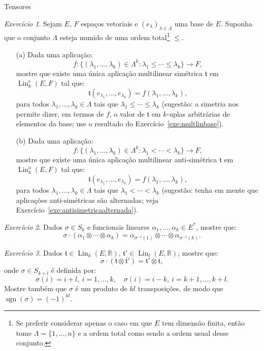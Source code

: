 \documentclass[oneside,11pt]{amsart}
\newcommand{\R}{\mathds R}
\DeclareMathOperator{\Lin}{Lin}
\DeclareMathOperator{\sgn}{sgn}
\theoremstyle{remark}\newtheorem{exercise}{Exercício}[section]
\theoremstyle{plain}\newtheorem{teo}{Teorema}[section]
\theoremstyle{plain}\newtheorem{lem}[teo]{Lema}
\theoremstyle{plain}\newtheorem{prop}[teo]{Proposição}
\theoremstyle{definition}\newtheorem{defin}[teo]{Definição}
\theoremstyle{remark}\newtheorem{rem}[teo]{Observação}
\theoremstyle{definition}\newtheorem{example}[teo]{Exemplo}
\numberwithin{equation}{section}
\begin{document}
\begin{section}{Tensores}
\begin{exercise}\label{exe:multlinebasessimetria}
Sejam $E$, $F$ espaços vetoriais e $(e_\lambda)_{\lambda\in\Lambda}$ uma base de $E$. Suponha que o conjunto $\Lambda$ esteja munido de uma ordem total\footnote{%
Se preferir considerar apenas o caso em que $E$ tem dimensão finita, então tome $\Lambda=\{1,\ldots,n\}$ e a ordem total como sendo a ordem
usual desse conjunto.} $\le$.
\begin{itemize}
\item[(a)] Dada uma aplicação:
\[f:\big\{(\lambda_1,\ldots,\lambda_k)\in\Lambda^k:\lambda_1\le\cdots\le\lambda_k\big\}\longrightarrow F,\]
mostre que existe uma única aplicação multilinear simétrica $\mathfrak t$ em $\Lin_k^{\mathrm s}(E,F)$ tal que:
\[\mathfrak t(e_{\lambda_1},\ldots,e_{\lambda_k})=f(\lambda_1,\ldots,\lambda_k),\]
para todos $\lambda_1,\ldots,\lambda_k\in\Lambda$ tais que $\lambda_1\le\cdots\le\lambda_k$ (sugestão: a simetria nos permite dizer, em termos de $f$,
o valor de $\mathfrak t$ em $k$-uplas arbitrárias de elementos da base; use o resultado do Exercício~\ref{exe:multlinbase}).
\item[(b)] Dada uma aplicação:
\[f:\big\{(\lambda_1,\ldots,\lambda_k)\in\Lambda^k:\lambda_1<\cdots<\lambda_k\big\}\longrightarrow F,\]
mostre que existe uma única aplicação multilinear anti-simétrica $\mathfrak t$ em $\Lin_k^{\mathrm a}(E,F)$ tal que:
\[\mathfrak t(e_{\lambda_1},\ldots,e_{\lambda_k})=f(\lambda_1,\ldots,\lambda_k),\]
para todos $\lambda_1,\ldots,\lambda_k\in\Lambda$ tais que $\lambda_1<\cdots<\lambda_k$ (sugestão: tenha em mente que aplicações anti-simétricas são alternadas;
veja Exercício~\ref{exe:antisimetricaalternada}).
\end{itemize}
\end{exercise}

\begin{exercise}
Dados $\sigma\in S_k$ e funcionais lineares $\alpha_1,\ldots,\alpha_k\in E^*$, mostre que:
\[\sigma\cdot(\alpha_1\otimes\cdots\otimes\alpha_k)=\alpha_{\sigma^{-1}(1)}\otimes\cdots\otimes\alpha_{\sigma^{-1}(k)}.\]
\end{exercise}

\begin{exercise}\label{exe:trocattlinha}
Dados $\mathfrak t\in\Lin_k(E,\R)$, $\mathfrak t'\in\Lin_l(E,\R)$, mostre que:
\[\sigma\cdot(\mathfrak t\otimes\mathfrak t')=\mathfrak t'\otimes\mathfrak t,\]
onde $\sigma\in S_{k+l}$ é definida por:
\[\sigma(i)=i+l,\ i=1,\ldots,k,\quad\sigma(i)=i-k,\ i=k+1,\ldots,k+l.\]
Mostre também que $\sigma$ é um produto de $kl$ transposições, de modo que $\sgn(\sigma)=(-1)^{kl}$.
\end{exercise}


\end{section}
\end{document}
